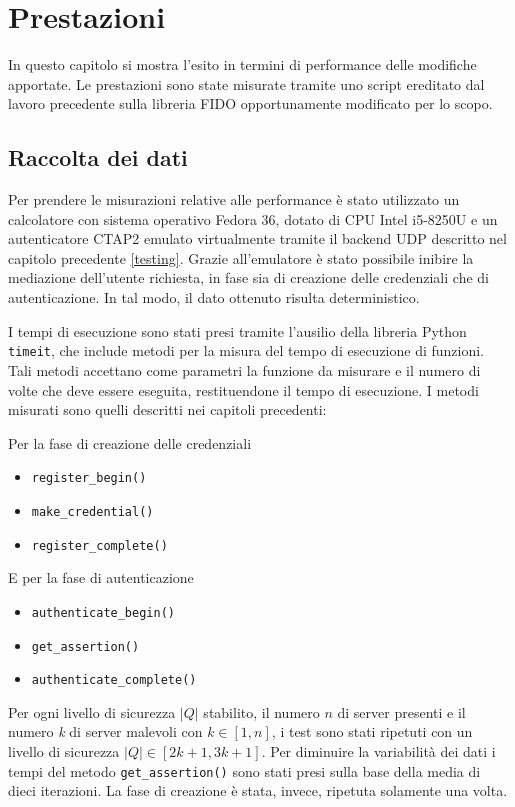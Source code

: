 \chapter{Prestazioni}
\label{prestazioni}

In questo capitolo si mostra l'esito in termini di performance delle modifiche apportate. Le prestazioni sono state misurate tramite uno script ereditato dal lavoro precedente sulla libreria FIDO opportunamente modificato per lo scopo. 

\section{Raccolta dei dati}
\label{raccolta_dati}

Per prendere le misurazioni relative alle performance è stato utilizzato un calcolatore con sistema operativo Fedora 36, dotato di CPU Intel i5-8250U e un autenticatore CTAP2 emulato virtualmente tramite il backend UDP descritto nel capitolo precedente \ref{testing}. Grazie all'emulatore è stato possibile inibire la mediazione dell'utente richiesta, in fase sia di creazione delle credenziali che di autenticazione. In tal modo, il dato ottenuto risulta deterministico.

I tempi di esecuzione sono stati presi tramite l'ausilio della libreria Python \verb*|timeit|, che include metodi per la misura del tempo di esecuzione di funzioni. Tali metodi accettano come parametri la funzione da misurare e il numero di volte che deve essere eseguita, restituendone il tempo di esecuzione. I metodi misurati sono quelli descritti nei capitoli precedenti:

Per la fase di creazione delle credenziali
\begin{itemize}
	\item \verb*|register_begin()|
	\item \verb*|make_credential()|
	\item \verb*|register_complete()|
\end{itemize}
E per la fase di autenticazione
\begin{itemize}
	\item \verb*|authenticate_begin()|
	\item \verb*|get_assertion()|
	\item \verb*|authenticate_complete()|
\end{itemize}

Per ogni livello di sicurezza $|Q|$ stabilito, il numero $n$ di server presenti e il numero \emph{k} di server malevoli con $k \in [1,n]$, i test sono stati ripetuti con un livello di sicurezza $|Q| \in [2k+1, 3k+1]$. Per diminuire la variabilità dei dati i tempi del metodo \verb*|get_assertion()| sono stati presi sulla base della media di dieci iterazioni. La fase di creazione è stata, invece, ripetuta solamente una volta.

